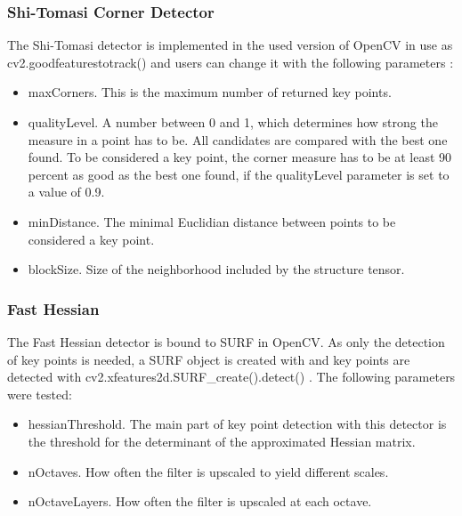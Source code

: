 \documentclass[Bachelorarbeit.tex]{subfiles}
\begin{document}
\subsubsection{Shi-Tomasi Corner Detector}
The Shi-Tomasi detector is implemented in the used version of OpenCV in use as cv2.goodfeaturestotrack() and users can change it with the following parameters \citep{itseez2019theopencv}:
\begin{itemize}
	\item maxCorners. This is the maximum number of returned key points.
	\item qualityLevel. A number between 0 and 1, which determines how strong the measure in a point has to be. All candidates are compared with the best one found. To be considered a key point, the corner measure has to be at least 90 percent as good as the best one found, if the qualityLevel parameter is set to a value of 0.9.
	\item minDistance. The minimal Euclidian distance between points to be considered a key point.
	\item blockSize. Size of the neighborhood included by the structure tensor.
\end{itemize}

\subsubsection{Fast Hessian}
The Fast Hessian detector is bound to SURF in OpenCV. As only the detection of key points is needed, a SURF object is created with  and key points are detected with cv2.xfeatures2d.SURF\_create().detect() \citep{itseez2019theopencv}. The following parameters were tested:
\begin{itemize}
	\item hessianThreshold. The main part of key point detection with this detector is the threshold for the determinant of the approximated Hessian matrix.
	\item nOctaves. How often the filter is upscaled to yield different scales.
	\item nOctaveLayers. How often the filter is upscaled at each octave.
\end{itemize}
\end{document}
